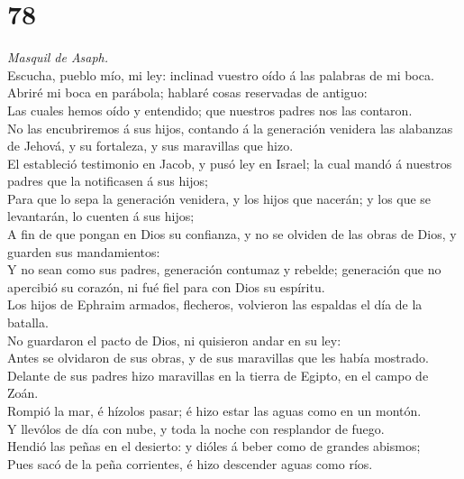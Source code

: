 \hypertarget{section-77}{%
\section{78}\label{section-77}}

 \emph{Masquil de Asaph.}\\
Escucha, pueblo mío, mi ley: inclinad vuestro oído á las palabras de mi
boca.\\
 Abriré mi boca en parábola; hablaré cosas reservadas de
antiguo:\\
 Las cuales hemos oído y entendido; que nuestros padres nos
las contaron.\\
 No las encubriremos á sus hijos, contando á la generación
venidera las alabanzas de Jehová, y su fortaleza, y sus maravillas que
hizo.\\
 El estableció testimonio en Jacob, y pusó ley en Israel; la
cual mandó á nuestros padres que la notificasen á sus hijos;\\
 Para que lo sepa la generación venidera, y los hijos que
nacerán; y los que se levantarán, lo cuenten á sus hijos;\\
 A fin de que pongan en Dios su confianza, y no se olviden
de las obras de Dios, y guarden sus mandamientos:\\
 Y no sean como sus padres, generación contumaz y rebelde;
generación que no apercibió su corazón, ni fué fiel para con Dios su
espíritu.\\
 Los hijos de Ephraim armados, flecheros, volvieron las
espaldas el día de la batalla.\\
 No guardaron el pacto de Dios, ni quisieron andar en su
ley:\\
 Antes se olvidaron de sus obras, y de sus maravillas que
les había mostrado.\\
 Delante de sus padres hizo maravillas en la tierra de
Egipto, en el campo de Zoán.\\
 Rompió la mar, é hízolos pasar; é hizo estar las aguas
como en un montón.\\
 Y llevólos de día con nube, y toda la noche con resplandor
de fuego.\\
 Hendió las peñas en el desierto: y dióles á beber como de
grandes abismos;\\
 Pues sacó de la peña corrientes, é hizo descender aguas
como ríos.\\
